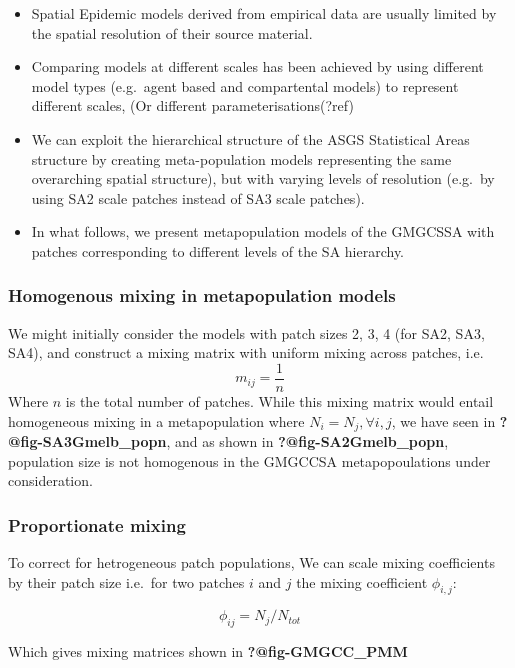 \documentclass[
  letterpaper,
  DIV=11,
  numbers=noendperiod]{scrartcl}
\begin{document}
\begin{itemize}
\item
  Spatial Epidemic models derived from empirical data are usually
  limited by the spatial resolution of their source material.
\item
  Comparing models at different scales has been achieved by using
  different model types (e.g.~agent based and compartental models) to
  represent different scales, (Or different parameterisations(?ref)
\item
  We can exploit the hierarchical structure of the ASGS Statistical
  Areas structure by creating meta-population models representing the
  same overarching spatial structure), but with varying levels of
  resolution (e.g.~by using SA2 scale patches instead of SA3 scale
  patches).
\item
  In what follows, we present metapopulation models of the GMGCSSA with
  patches corresponding to different levels of the SA hierarchy.
\end{itemize}

\hypertarget{homogenous-mixing-in-metapopulation-models}{%
\subsubsection{Homogenous mixing in metapopulation
models}\label{homogenous-mixing-in-metapopulation-models}}

We might initially consider the models with patch sizes 2, 3, 4 (for
SA2, SA3, SA4), and construct a mixing matrix with uniform mixing across
patches, i.e.~\[
m_{ij} = \frac{1}{n}
\]Where \(n\) is the total number of patches. While this mixing matrix
would entail homogeneous mixing in a metapopulation where
\(N_i = N_j, \forall i,j\), we have seen in
\textbf{?@fig-SA3Gmelb\_popn}, and as shown in
\textbf{?@fig-SA2Gmelb\_popn}, population size is not homogenous in the
GMGCCSA metapopoulations under consideration.

\hypertarget{sec-propmix}{%
\subsubsection{Proportionate mixing}\label{sec-propmix}}

To correct for hetrogeneous patch populations, We can scale mixing
coefficients by their patch size i.e.~for two patches \(i\) and \(j\)
the mixing coefficient \(\phi_{i,j}\):

\[
\phi_{ij} = N_j/N_{tot}
\]

Which gives mixing matrices shown in \textbf{?@fig-GMGCC\_PMM}
\end{document}
